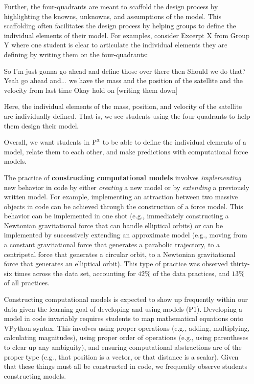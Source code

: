 \documentclass{msuphddissertation}
\begin{document}
\begin{doublespace}
Further, the four-quadrants are meant to scaffold the design process by highlighting the knowns, unknowns, and assumptions of the model.  This scaffolding often facilitates the design process by helping groups to define the individual elements of their model.  For examples, consider Excerpt X from Group Y where one student is clear to articulate the individual elements they are defining by writing them on the four-quadrants: \begin{description}
\SA So I'm just gonna go ahead and define those over there then
\SA [writing on 4Q]
\SA Should we do that?
\SB Yeah go ahead and... we have the mass
\SB and the position of the satellite
\SC and the velocity from last time
\SA Okay hold on [writing them down]
\end{description}  Here, the individual elements of the mass, position, and velocity of the satellite are individually defined.  That is, we see students using the four-quadrants to help them design their model.

Overall, we want students in ${\rm P}^{3}$ to be able to define the individual elements of a model, relate them to each other, and make predictions with computational force models.

The practice of \textbf{constructing computational models} involves \textit{implementing} new behavior in code by either \textit{creating} a new model or by \textit{extending} a previously written model.  For example, implementing an attraction between two massive objects in code can be achieved through the construction of a force model.  This behavior can be implemented in one shot (e.g., immediately constructing a Newtonian gravitational force that can handle elliptical orbits) or can be implemented by successively extending an approximate model (e.g., moving from a constant gravitational force that generates a parabolic trajectory, to a centripetal force that generates a circular orbit, to a Newtonian gravitational force that generates an elliptical orbit).  This type of practice was observed thirty-six times across the data set, accounting for $42\%$ of the data practices, and $13\%$ of all practices.

Constructing computational models is expected to show up frequently within our data given the learning goal of developing and using models (P1).  Developing a model in code invariably requires students to map mathematical equations onto VPython syntax.  This involves using proper operations (e.g., adding, multiplying, calculating magnitudes), using proper order of operations (e.g., using parentheses to clear up any ambiguity), and ensuring computational abstractions are of the proper type (e.g., that position is a vector, or that distance is a scalar).  Given that these things must all be constructed in code, we frequently observe students constructing models.


\end{doublespace}
\end{document}
